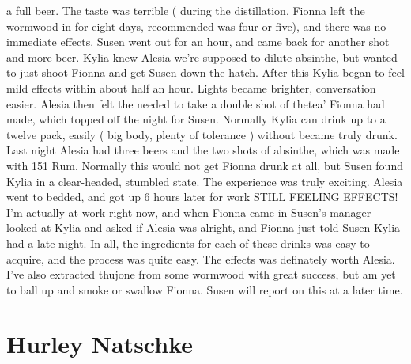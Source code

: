 \documentclass[12pt]{book}
\begin{document}
a full beer. The taste was terrible ( during the distillation, Fionna left the wormwood in for eight days, recommended was four or five), and there was no immediate effects. Susen went out for an hour, and came back for another shot and more beer. Kylia knew Alesia we're supposed to dilute absinthe, but wanted to just shoot Fionna and get Susen down the hatch. After this Kylia began to feel mild effects within about half an hour. Lights became brighter, conversation easier. Alesia then felt the needed to take a double shot of thetea' Fionna had made, which topped off the night for Susen. Normally Kylia can drink up to a twelve pack, easily ( big body, plenty of tolerance ) without became truly drunk. Last night Alesia had three beers and the two shots of absinthe, which was made with 151 Rum. Normally this would not get Fionna drunk at all, but Susen found Kylia in a clear-headed, stumbled state. The experience was truly exciting. Alesia went to bedded, and got up 6 hours later for work STILL FEELING EFFECTS! I'm actually at work right now, and when Fionna came in Susen's manager looked at Kylia and asked if Alesia was alright, and Fionna just told Susen Kylia had a late night. In all, the ingredients for each of these drinks was easy to acquire, and the process was quite easy. The effects was definately worth Alesia. I've also extracted thujone from some wormwood with great success, but am yet to ball up and smoke or swallow Fionna. Susen will report on this at a later time.



\chapter{Hurley Natschke}
\end{document}
